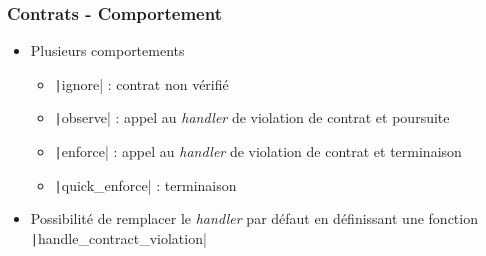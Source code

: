 \documentclass[C++.tex]{subfiles}
\begin{document}
\begin{frame}[fragile]
	\frametitle{Contrats - Comportement}
	\begin{itemize}
		\item Plusieurs comportements
		\begin{itemize}
			\item \texttt|ignore| : contrat non vérifié
			\item \texttt|observe| : appel au \textit{handler} de violation de contrat et poursuite
			\item \texttt|enforce| : appel au \textit{handler} de violation de contrat et terminaison
			\item \texttt|quick_enforce| : terminaison

		\end{itemize}
		\item Possibilité de remplacer le \textit{handler} par défaut en définissant une fonction \texttt|handle_contract_violation|

	\end{itemize}

\end{frame}
\end{document}
